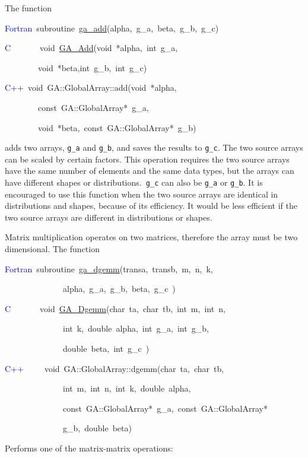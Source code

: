 The function
\begin{lyxcode}
\textcolor{blue}{Fortran}~subroutine~\href{http://www.emsl.pnl.gov/docs/global/ga_ops.html\#ga_add}{ga\_{}add}(alpha,~g\_a,~beta,~g\_b,~g\_c)~

\textcolor{blue}{C}~~~~~~~void~\href{http://www.emsl.pnl.gov/docs/global/c_nga_ops.html\#ga_add}{GA\_{}Add}(void~{*}alpha,~int~g\_a,~

~~~~~~~~void~{*}beta,int~g\_b,~int~g\_c)~

\textcolor{blue}{C++}~void~GA::GlobalArray::add(void~{*}alpha,~~

~~~~~~~~const~GA::GlobalArray{*}~g\_a,~

~~~~~~~~void~{*}beta,~const~GA::GlobalArray{*}~g\_b)
\end{lyxcode}
adds two arrays, \texttt{g\_a} and \texttt{g\_b}, and saves the results
to \texttt{g\_c}. The two source arrays can be scaled by certain factors.
This operation requires the two source arrays have the same number
of elements and the same data types, but the arrays can have different
shapes or distributions.\texttt{ g\_c} can also be \texttt{g\_a} or
\texttt{g\_b}. It is encouraged to use this function when the two
source arrays are identical in distributions and shapes, because of
its efficiency. It would be less efficient if the two source arrays
are different in distributions or shapes.

Matrix multiplication operates on two matrices, therefore the array
must be two dimensional. The function
\begin{lyxcode}
\textcolor{blue}{Fortran}~subroutine~\href{http://www.emsl.pnl.gov/docs/global/ga_ops.html\#ga_dgemm}{ga\_{}dgemm}(transa,~transb,~m,~n,~k,~

~~~~~~~~~~~~~~alpha,~g\_a,~g\_b,~beta,~g\_c~)~

\textcolor{blue}{C}~~~~~~~void~\href{http://www.emsl.pnl.gov/docs/global/c_nga_ops.html\#ga_dgemm}{GA\_{}Dgemm}(char~ta,~char~tb,~int~m,~int~n,~

~~~~~~~~~~~~~~int~k,~double~alpha,~int~g\_a,~int~g\_b,~

~~~~~~~~~~~~~~double~beta,~int~g\_c~)~

\textcolor{blue}{C++}~~~~~void~GA::GlobalArray::dgemm(char~ta,~char~tb,~

~~~~~~~~~~~~~~int~m,~int~n,~int~k,~double~alpha,~

~~~~~~~~~~~~~~const~GA::GlobalArray{*}~g\_a,~const~GA::GlobalArray{*}~

~~~~~~~~~~~~~~g\_b,~double~beta)
\end{lyxcode}
Performs one of the matrix-matrix operations:

